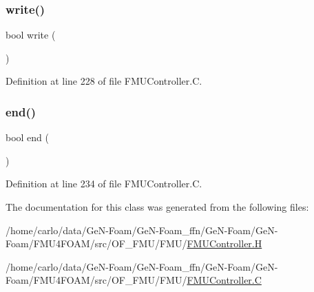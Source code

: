 \subsubsection{\texorpdfstring{write()}{write()}}
{\footnotesize\ttfamily bool write (\begin{DoxyParamCaption}{ }\end{DoxyParamCaption})\hspace{0.3cm}{\ttfamily [virtual]}}



Definition at line 228 of file F\+M\+U\+Controller.\+C.

\mbox{\label{classFoam_1_1functionObjects_1_1FMUController_af545ab12986d2fe462f1013c3bafb5f3}} 
\subsubsection{\texorpdfstring{end()}{end()}}
{\footnotesize\ttfamily bool end (\begin{DoxyParamCaption}{ }\end{DoxyParamCaption})\hspace{0.3cm}{\ttfamily [virtual]}}



Definition at line 234 of file F\+M\+U\+Controller.\+C.



The documentation for this class was generated from the following files\+:\begin{DoxyCompactItemize}
\item 
/home/carlo/data/\+Ge\+N-\/\+Foam/\+Ge\+N-\/\+Foam\+\_\+ffn/\+Ge\+N-\/\+Foam/\+Ge\+N-\/\+Foam/\+F\+M\+U4\+F\+O\+A\+M/src/\+O\+F\+\_\+\+F\+M\+U/\+F\+M\+U/\hyperlink{FMUController_8H}{F\+M\+U\+Controller.\+H}\item 
/home/carlo/data/\+Ge\+N-\/\+Foam/\+Ge\+N-\/\+Foam\+\_\+ffn/\+Ge\+N-\/\+Foam/\+Ge\+N-\/\+Foam/\+F\+M\+U4\+F\+O\+A\+M/src/\+O\+F\+\_\+\+F\+M\+U/\+F\+M\+U/\hyperlink{FMUController_8C}{F\+M\+U\+Controller.\+C}\end{DoxyCompactItemize}
